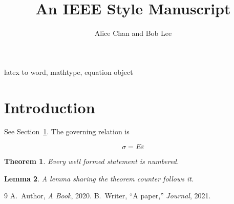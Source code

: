 \documentclass[conference]{IEEEtran}
\newtheorem{theorem}{Theorem}
\newtheorem{lemma}[theorem]{Lemma}
\begin{document}
\title{An IEEE Style Manuscript}
\author{Alice Chan and Bob Lee}


\begin{IEEEkeywords}
latex to word, mathtype, equation object
\end{IEEEkeywords}

\section{Introduction}
\label{sec:intro}

See Section~\ref{sec:intro}. The governing relation is

\begin{equation}
\sigma = E \varepsilon
\label{eq:hooke}
\end{equation}

\begin{theorem}
\label{thm:first}
Every well formed statement is numbered.
\end{theorem}

\begin{lemma}
\label{lem:first}
A lemma sharing the theorem counter follows it.
\end{lemma}

\begin{thebibliography}{9}
 A.~Author, \emph{A Book}, 2020.
 B.~Writer, ``A paper,'' \emph{Journal}, 2021.
\end{thebibliography}
\end{document}
